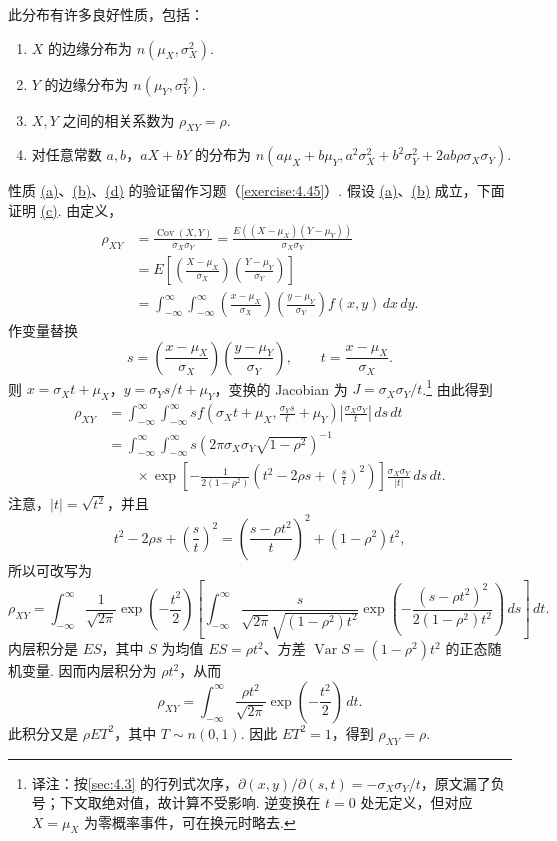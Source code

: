 此分布有许多良好性质，包括：
\begin{enumerate}
\item[(a)]\label{itm:bivnormal:a} $X$ 的边缘分布为 $n(\mu_X,\sigma_X^2)$.
\item[(b)]\label{itm:bivnormal:b} $Y$ 的边缘分布为 $n(\mu_Y,\sigma_Y^2)$.
\item[(c)]\label{itm:bivnormal:c} $X,Y$ 之间的相关系数为 $\rho_{XY}=\rho$.
\item[(d)]\label{itm:bivnormal:d} 对任意常数 $a,b$，$aX+bY$ 的分布为 $n(a\mu_X+b\mu_Y,a^2\sigma_X^2+b^2\sigma_Y^2+2ab\rho\sigma_X\sigma_Y)$.
\end{enumerate}
性质 \hyperref[itm:bivnormal:a]{(a)}、\hyperref[itm:bivnormal:b]{(b)}、\hyperref[itm:bivnormal:d]{(d)} 的验证留作习题（\autoref{exercise:4.45}）. 假设 \hyperref[itm:bivnormal:a]{(a)}、\hyperref[itm:bivnormal:b]{(b)} 成立，下面证明 \hyperref[itm:bivnormal:c]{(c)}. 由定义，
$$\begin{aligned}
\rho_{XY}&=\frac{\operatorname{Cov}(X,Y)}{\sigma_X\sigma_Y}
=\frac{E((X-\mu_X)(Y-\mu_Y))}{\sigma_X\sigma_Y}\\
&=E\left[\left(\frac{X-\mu_X}{\sigma_X}\right)\left(\frac{Y-\mu_Y}{\sigma_Y}\right)\right]\\
&=\int_{-\infty}^{\infty}\int_{-\infty}^{\infty}\left(\frac{x-\mu_X}{\sigma_X}\right)\left(\frac{y-\mu_Y}{\sigma_Y}\right)f(x,y)\,dx\,dy.
\end{aligned}$$
作变量替换
$$s=\left(\frac{x-\mu_X}{\sigma_X}\right)\left(\frac{y-\mu_Y}{\sigma_Y}\right),\qquad t=\frac{x-\mu_X}{\sigma_X}.$$
则 $x=\sigma_Xt+\mu_X$，$y=\sigma_Ys/t+\mu_Y$，变换的 Jacobian 为 $J=\sigma_X\sigma_Y/t$.\footnote{译注：按\autoref{sec:4.3} 的行列式次序，$\partial(x,y)/\partial(s,t)=-\sigma_X\sigma_Y/t$，原文漏了负号；下文取绝对值，故计算不受影响. 逆变换在 $t=0$ 处无定义，但对应 $X=\mu_X$ 为零概率事件，可在换元时略去.} 由此得到
$$\begin{aligned}
\rho_{XY}&=\int_{-\infty}^{\infty}\int_{-\infty}^{\infty}s f\left(\sigma_Xt+\mu_X,\frac{\sigma_Ys}t+\mu_Y\right)
\left|\frac{\sigma_X\sigma_Y}t\right|\,ds\,dt\\
&=\int_{-\infty}^{\infty}\int_{-\infty}^{\infty}s\left(2\pi\sigma_X\sigma_Y\sqrt{1-\rho^2}\right)^{-1}\\
&\qquad\times\exp\left[-\frac1{2(1-\rho^2)}\left(t^2-2\rho s+\left(\frac st\right)^2\right)\right]
\frac{\sigma_X\sigma_Y}{|t|}\,ds\,dt.
\end{aligned}$$
注意，$|t|=\sqrt{t^2}$，并且
$$t^2-2\rho s+\left(\frac st\right)^2=\left(\frac{s-\rho t^2}t\right)^2+(1-\rho^2)t^2,$$
所以可改写为
$$\rho_{XY}=\int_{-\infty}^{\infty}\frac1{\sqrt{2\pi}}\exp\left(-\frac{t^2}2\right)
\left[\int_{-\infty}^{\infty}\frac{s}{\sqrt{2\pi}\sqrt{(1-\rho^2)t^2}}
\exp\left(-\frac{(s-\rho t^2)^2}{2(1-\rho^2)t^2}\right)\,ds\right]\,dt.$$
内层积分是 $ES$，其中 $S$ 为均值 $ES=\rho t^2$、方差 $\operatorname{Var}S=(1-\rho^2)t^2$ 的正态随机变量. 因而内层积分为 $\rho t^2$，从而
$$\rho_{XY}=\int_{-\infty}^{\infty}\frac{\rho t^2}{\sqrt{2\pi}}\exp\left(-\frac{t^2}2\right)\,dt.$$
此积分又是 $\rho ET^2$，其中 $T\sim n(0,1)$. 因此 $ET^2=1$，得到 $\rho_{XY}=\rho$.

